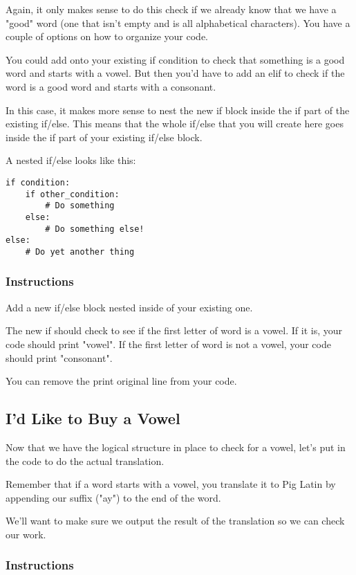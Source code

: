 \documentclass[12pt,a4paper,final,twoside,onecolumn,titlepage]{book}
\begin{document}
Again, it only makes sense to do this check if we already know that we have a "good" word (one that isn't empty and is all alphabetical characters). You have a couple of options on how to organize your code.

You could add onto your existing if condition to check that something is a good word and starts with a vowel. But then you'd have to add an elif to check if the word is a good word and starts with a consonant.

In this case, it makes more sense to nest the new if block inside the if part of the existing if/else. This means that the whole if/else that you will create here goes inside the if part of your existing if/else block.

A nested if/else looks like this:

\begin{lstlisting}
if condition:
    if other_condition:
        # Do something
    else:
        # Do something else!
else:
    # Do yet another thing

\end{lstlisting}

\subsubsection{Instructions}

Add a new if/else block nested inside of your existing one.

The new if should check to see if the first letter of word is a vowel. If it is, your code should print "vowel". If the first letter of word is not a vowel, your code should print "consonant".

You can remove the print original line from your code.

\subsection{I'd Like to Buy a Vowel}

Now that we have the logical structure in place to check for a vowel, let's put in the code to do the actual translation.

Remember that if a word starts with a vowel, you translate it to Pig Latin by appending our suffix ("ay") to the end of the word.

We'll want to make sure we output the result of the translation so we can check our work.
\subsubsection{Instructions}
\end{document}
